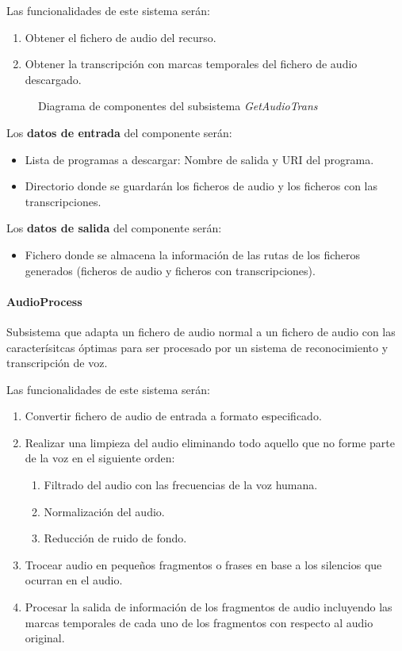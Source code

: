 \documentclass[../main.tex]{subfiles}
\begin{document}
Las funcionalidades de este sistema serán:
\begin{enumerate}
    \item Obtener el fichero de audio del recurso.
    \item Obtener la transcripción con marcas temporales del fichero de audio descargado.
\end{enumerate}

\begin{figure}[H]
    \centering
    
    \label{fig:components_getaudiotrans}
    \caption{Diagrama de componentes del subsistema \textit{GetAudioTrans}}
\end{figure}

Los \textbf{datos de entrada} del componente serán:
\begin{itemize}
    \item Lista de programas a descargar: Nombre de salida y URI del programa.
    \item Directorio donde se guardarán los ficheros de audio y los ficheros con las transcripciones.
\end{itemize}

Los \textbf{datos de salida} del componente serán:
\begin{itemize}
    \item Fichero donde se almacena la información de las rutas de los ficheros generados (ficheros de audio y ficheros con transcripciones).
\end{itemize}

\paragraph{AudioProcess}\label{par:audioprocess}
Subsistema que adapta un fichero de audio normal a un fichero de audio con las caracterísitcas óptimas para ser procesado por un sistema de reconocimiento y transcripción de voz.

Las funcionalidades de este sistema serán:
\begin{enumerate}
    \item Convertir fichero de audio de entrada a formato especificado.
    \item Realizar una limpieza del audio eliminando todo aquello que no forme parte de la voz en el siguiente orden:
    \begin{enumerate}[label=\theenumi.\arabic*]
        \item Filtrado del audio con las frecuencias de la voz humana.
        \item Normalización del audio.
        \item Reducción de ruido de fondo.
    \end{enumerate}
    \item Trocear audio en pequeños fragmentos o frases en base a los silencios que ocurran en el audio.
    \item Procesar la salida de información de los fragmentos de audio incluyendo las marcas temporales de cada uno de los fragmentos con respecto al audio original.
\end{enumerate}
\end{document}
